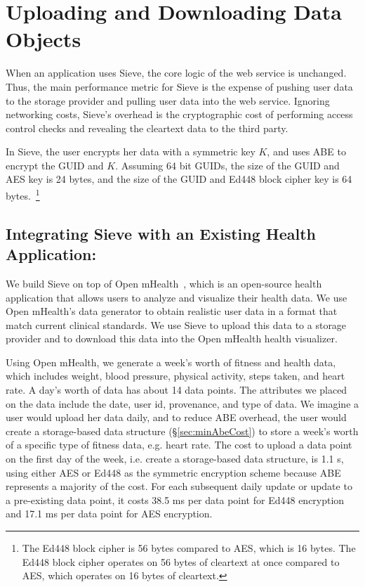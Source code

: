 \section{Uploading and Downloading Data Objects}
When an application uses Sieve, the core
logic of the web service is
unchanged. Thus, the main performance metric
for Sieve is the expense of pushing user data
to the storage provider and pulling user
data into the web service. Ignoring networking
costs, Sieve's overhead is the cryptographic
cost of performing access control checks and
revealing the cleartext data to the third
party.

In Sieve, the user encrypts her data with a symmetric
key $K$, and uses ABE to encrypt the GUID and
$K$. Assuming 64 bit GUIDs, the size of the GUID and AES key
is 24 bytes, and the size of the GUID and Ed448 block cipher key is 64 bytes.~\footnote{
The Ed448 block cipher is 56 bytes compared to AES, which is 16 bytes.
The Ed448 block cipher operates on 56 bytes of cleartext at once
compared to AES, which operates on 16 bytes of cleartext.}  

\subsection{Integrating Sieve with an Existing Health Application:} 
We build Sieve on top of Open mHealth~\cite{omh}, which is an open-source
health application that allows users to analyze and visualize their health data.
We use Open mHealth's data generator to obtain realistic user data in a format
that match current clinical standards. We use Sieve to upload this data to
a storage provider and to download this data into the Open
mHealth health visualizer.

Using Open mHealth, we generate a 
week's worth of fitness and health data, which includes weight,
blood pressure, physical activity, steps taken, and heart rate. 
A day's worth of data has about 14 data points.
The attributes we placed on the data include 
the date, user id, provenance, and type of data.
We imagine a user would 
upload her data daily, and to reduce ABE overhead, the user would create a 
storage-based data structure (\S\ref{sec:minAbeCost}) to store 
a week's worth of a specific type of fitness data, e.g. heart rate. 
The cost to upload a data point on the first day of the week, 
i.e. create a storage-based data structure, is 1.1 s,
using either AES or Ed448 as the symmetric encryption scheme
because ABE represents a majority of the cost. For each subsequent
daily update or update to a pre-existing data point, 
it costs 38.5 ms per data point for Ed448
encryption and 17.1 ms per data point for AES encryption. 

